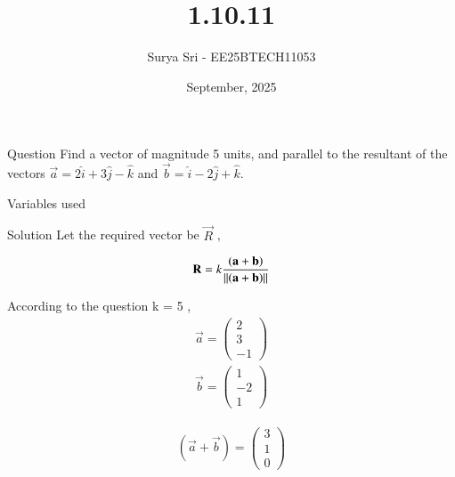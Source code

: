 \documentclass{beamer}
\title 
{1.10.11}
\date{September, 2025}
\author 
{Surya Sri - EE25BTECH11053}
\begin{document}
\frame{\titlepage}
\begin{frame}{Question}
Find a vector of magnitude 5 units, and parallel to the resultant of the vectors $\vec{a} = 2\hat{i} + 3\hat{j} - \hat{k}$ and $\vec{b} = \hat{i} - 2\hat{j} + \hat{k}$.
\end{frame}



\begin{frame}{Variables used}
\begin{table}[H]    
  \centering
  
  \caption{Variables Used}
  \label{tab:1.5.39}
\end{table}

\end{frame}

\begin{frame}{Solution}
Let the required vector be $\vec{R}$ ,

\begin{align}
    \mathbf{R} = k \frac{(\mathbf{a} + \mathbf{b})}{\left\lVert(\mathbf{a} + \mathbf{b})\right\rVert}
\end{align}

  According to the question k = 5 ,
\begin{align}
     \vec{a} = \begin{pmatrix} 2 \\ 3 \\ -1 \end{pmatrix} 
 \end{align}
 \begin{align}
 \vec{b} = \begin{pmatrix} 1 \\ -2 \\ 1 \end{pmatrix} 
 \end{align}

\begin{align}
(\vec{a} + \vec{b}) = \begin{pmatrix} 3 \\ 1 \\ 0 \end{pmatrix}
\end{align}

\end{frame}
\end{document}
